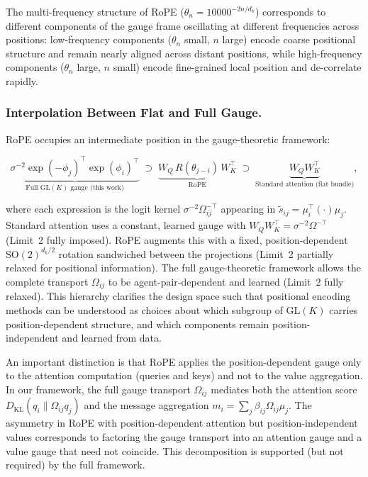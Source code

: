 \documentclass[twoside,11pt]{article}
\begin{document}
The multi-frequency structure of RoPE ($\theta_n = 10000^{-2n/d_k}$) corresponds to different components of the gauge frame oscillating at different frequencies across positions: low-frequency components ($\theta_n$ small, $n$ large) encode coarse positional structure and remain nearly aligned across distant positions, while high-frequency components ($\theta_n$ large, $n$ small) encode fine-grained local position and de-correlate rapidly. 

\subsubsection{Interpolation Between Flat and Full Gauge.}

RoPE occupies an intermediate position in the gauge-theoretic framework:

\begin{equation}
\underbrace{\sigma^{-2}\exp(-\phi_j)^\top\exp(\phi_i)^\top}_{\text{Full GL}(K)\text{ gauge (this work)}} \;\supset\;
\underbrace{W_Q\, R(\theta_{j-i})\, W_K^\top}_{\text{RoPE}} \;\supset\;
\underbrace{W_Q W_K^\top}_{\text{Standard attention (flat bundle)}},
\end{equation}

where each expression is the logit kernel $\sigma^{-2}\Omega_{ij}^{-\top}$ appearing in $\tilde{s}_{ij} = \mu_i^\top(\cdot)\mu_j$. Standard attention uses a constant, learned gauge with $W_Q W_K^\top = \sigma^{-2}\Omega^{-\top}$ (Limit~2 fully imposed). RoPE augments this with a fixed, position-dependent $\mathrm{SO}(2)^{d_k/2}$ rotation sandwiched between the projections (Limit~2 partially relaxed for positional information). The full gauge-theoretic framework allows the complete transport $\Omega_{ij}$ to be agent-pair-dependent and learned (Limit~2 fully relaxed). This hierarchy clarifies the design space such that positional encoding methods can be understood as choices about which subgroup of $\mathrm{GL}(K)$ carries position-dependent structure, and which components remain position-independent and learned from data.

An important distinction is that RoPE applies the position-dependent gauge only to the attention computation (queries and keys) and not to the value aggregation. In our framework, the full gauge transport $\Omega_{ij}$ mediates both the attention score $D_{\mathrm{KL}}(q_i \| \Omega_{ij} q_j)$ and the message aggregation $m_i = \sum_j \beta_{ij} \Omega_{ij}\mu_j$. The asymmetry in RoPE with position-dependent attention but position-independent values corresponds to factoring the gauge transport into an attention gauge and a value gauge that need not coincide. This decomposition is supported (but not required) by the full framework.
\end{document}
